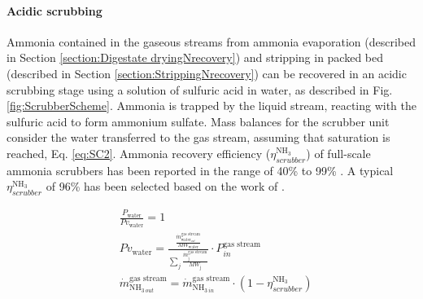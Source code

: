 \begin{refsection}[referencesCh6]

\paragraph{\textbf{Acidic scrubbing}} \label{section:scrubbing}
Ammonia contained in the gaseous streams from
ammonia evaporation (described in Section \ref{section:Digestate dryingNrecovery}) and stripping in packed bed (described in Section \ref{section:StrippingNrecovery}) can be recovered in an acidic scrubbing stage using a solution of sulfuric acid in water, as described in Fig. \ref{fig:ScrubberScheme}. Ammonia is trapped by the liquid stream, reacting with the sulfuric acid to form ammonium sulfate.
Mass balances for the scrubber unit consider the water transferred to the gas stream, assuming that saturation is reached, Eq. \ref{eq:SC2}. Ammonia  recovery efficiency ($\eta_{scrubber}^{\text{NH}_3}$) of full-scale ammonia scrubbers has been reported in the range of 40\% to 99\% \citep{melse2005}. A typical $\eta_{scrubber}^{\text{NH}_3}$ of 96\% has been selected based on the work of \citet{melse2005}.


\begin{align}
& \frac{P_{\text{water}}}{Pv_{\text{water}}} = 1 \label{eq:SC1} 
\\
& Pv_{\text{water}} = \frac{\frac{\dot{m}_{\text{water}_{out}}^{\text{gas stream}}}{MW_\text{water}}}
{\sum_{j}\frac{\dot{m}_{\text{j}}^{\text{gas stream}}}{MW_\text{j}}}
\cdot P_{in}^{\text{gas stream}} \label{eq:SC2} 
\\
& \dot{m}_{\text{NH}_{3 \ out}}^{\text{gas stream}} = \dot{m}_{\text{NH}_{3 \ in}}^{\text{gas stream}} \cdot \left(1-\eta_{scrubber}^{\text{NH}_3}\right) \label{eq:SC3}
\end{align}


\end{refsection}
